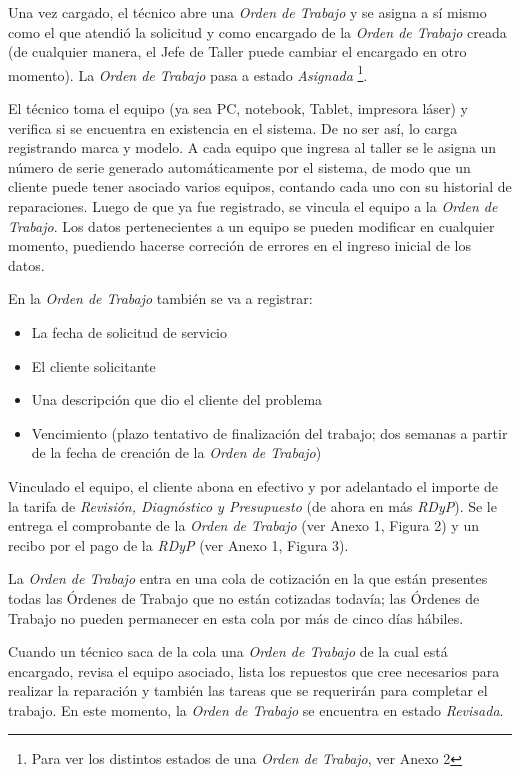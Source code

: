 \documentclass[12pt]{extarticle}
\begin{document}
\begin{spacing}{1.2}
    Una vez cargado, el técnico abre una \textit{Orden de Trabajo} y se asigna a sí mismo como el que atendió la solicitud y como encargado de la \textit{Orden de Trabajo} creada (de cualquier manera, el Jefe de Taller puede cambiar el encargado en otro momento). La \textit{Orden de Trabajo} pasa a estado \textit{Asignada} \footnote{Para ver los distintos estados de una \textit{Orden de Trabajo}, ver Anexo 2}. 

    El técnico toma el equipo (ya sea PC, notebook, Tablet, impresora láser) y verifica si se encuentra en existencia en el sistema. De no ser así, lo carga registrando marca y modelo. A cada equipo que ingresa al taller se le asigna un número de serie generado automáticamente por el sistema, de modo que un cliente puede tener asociado varios equipos, contando cada uno con su historial de reparaciones. Luego de que ya fue registrado, se vincula el equipo a la \textit{Orden de Trabajo}.
    Los datos pertenecientes a un equipo se pueden modificar en cualquier momento, puediendo hacerse correción de errores en el ingreso inicial de los datos.
   
    En la \textit{Orden de Trabajo} también se va a registrar:
    \begin{itemize}
        \item La fecha de solicitud de servicio
        \item El cliente solicitante
        \item Una descripción que dio el cliente del problema
        \item Vencimiento (plazo tentativo de finalización del trabajo; dos semanas a partir de la fecha de creación de la \textit{Orden de Trabajo})
    \end{itemize}

    Vinculado el equipo, el cliente abona en efectivo y por adelantado el importe de la tarifa de \textit{Revisión, Diagnóstico y Presupuesto} (de ahora en más \textit{RDyP}). Se le entrega el comprobante de la \textit{Orden de Trabajo} (ver Anexo 1, Figura 2) y un recibo por el pago de la \textit{RDyP} (ver Anexo 1, Figura 3). 

    La \textit{Orden de Trabajo} entra en una cola de cotización en la que están presentes todas las Órdenes de Trabajo que no están cotizadas todavía; las Órdenes de Trabajo no pueden permanecer en esta cola por más de cinco días hábiles.
    
    Cuando un técnico saca de la cola una \textit{Orden de Trabajo} de la cual está encargado, revisa el equipo asociado, lista los repuestos que cree necesarios para realizar la reparación y también las tareas que se requerirán para completar el trabajo. En este momento, la \textit{Orden de Trabajo} se encuentra en estado \textit{Revisada}.


\end{spacing}
\end{document}
